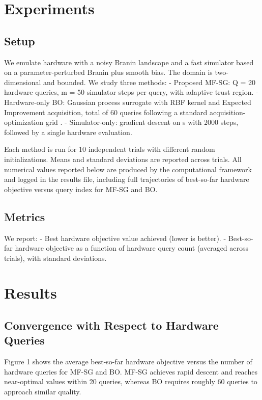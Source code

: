 \section{Experiments}
\subsection{Setup}
We emulate hardware with a noisy Branin landscape and a fast simulator based on a parameter-perturbed Branin plus smooth bias. The domain is two-dimensional and bounded. We study three methods:
- Proposed MF-SG: Q = 20 hardware queries, m = 50 simulator steps per query, with adaptive trust region.
- Hardware-only BO: Gaussian process surrogate with RBF kernel and Expected Improvement acquisition, total of 60 queries following a standard acquisition-optimization grid \citep{Shahriari2016,Frazier2018}.
- Simulator-only: gradient descent on s with 2000 steps, followed by a single hardware evaluation.

Each method is run for 10 independent trials with different random initializations. Means and standard deviations are reported across trials. All numerical values reported below are produced by the computational framework and logged in the results file, including full trajectories of best-so-far hardware objective versus query index for MF-SG and BO.

\subsection{Metrics}
We report:
- Best hardware objective value achieved (lower is better).
- Best-so-far hardware objective as a function of hardware query count (averaged across trials), with standard deviations.

\section{Results}
\subsection{Convergence with Respect to Hardware Queries}
Figure 1 shows the average best-so-far hardware objective versus the number of hardware queries for MF-SG and BO. MF-SG achieves rapid descent and reaches near-optimal values within 20 queries, whereas BO requires roughly 60 queries to approach similar quality.

